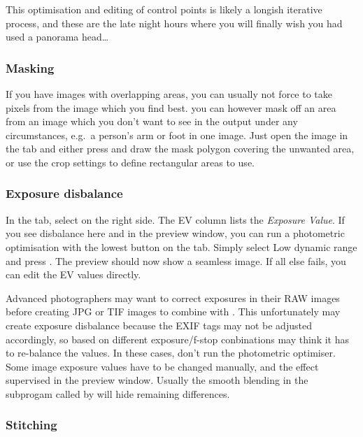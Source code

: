 This optimisation and editing of control points is likely a longish
iterative process, and these are the late night hours where you will
finally wish you had used a panorama head\ldots



\subsubsection{Masking}
\label{sec:landscapes:Masking}

If you have images with overlapping areas, you can usually not force
 to take pixels from the image which you find best. you can
however mask off an area from an image which you don't want to see in
the output under any circumstances, e.g.\ a person's arm or foot in
one image. Just open the image in the  tab and either press
 and draw the mask polygon covering the unwanted
area, or use the crop settings to define rectangular areas to use.

\subsubsection{Exposure disbalance}
\label{sec:landscapes:Exposure}
In the  tab, select  on the right
side. The EV column lists the \emph{Exposure Value}. If you see disbalance
here and in the preview window, you can run a photometric optimisation
with the lowest button on the  tab. Simply select Low dynamic
range and press . The preview should now show a seamless
image. If all else fails, you can edit the EV values directly. 

Advanced photographers may want to correct exposures in their RAW
images before creating JPG or TIF images to combine with
. This unfortunately may create exposure disbalance
because the EXIF tags may not be adjusted accordingly, so based on
different exposure/f-stop conbinations  may think it
has to re-balance the values. In these cases, don't run the
photometric optimiser. Some image exposure values have to be changed
manually, and the effect supervised in the preview window. Usually the
smooth blending in the subprogam  called by
 will hide remaining differences.



\subsubsection{Stitching}
\label{sec:landscapes:stitching}

